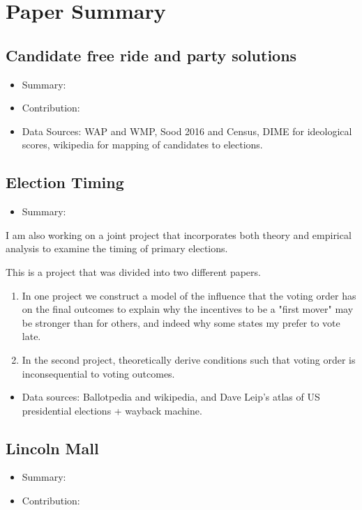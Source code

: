 \documentclass[12pt]{article}
\theoremstyle{plain}
\theoremstyle{plain}
\theoremstyle{plain}
\theoremstyle{plain}
\theoremstyle{plain}
\theoremstyle{plain}
\begin{document}
\section{Paper Summary}
\label{sec:org1e52e05}
\subsection{Candidate free ride and party solutions}
\label{sec:org4358c61}
\begin{itemize}
\item Summary:
\item Contribution:
\item Data Sources: WAP and WMP, Sood 2016 and Census, DIME for ideological scores, wikipedia for mapping of candidates to elections.
\end{itemize}
\subsection{Election Timing}
\label{sec:org3737faa}

\begin{itemize}
\item Summary:
\end{itemize}

I am also working on a joint project that incorporates both theory and empirical analysis to examine the timing of primary elections.

This is a project that was divided into two different papers.

\begin{enumerate}
\item In one project we construct a model of the influence that the voting order has on the final outcomes to explain why the incentives to be a "first mover" may be stronger than for others, and indeed why some states my prefer to vote late.

\item In the second project, theoretically derive conditions such that voting order is inconsequential to voting outcomes.
\end{enumerate}


\begin{itemize}
\item Data sources: Ballotpedia and wikipedia, and Dave Leip's atlas of US presidential elections + wayback machine.
\end{itemize}

\subsection{Lincoln Mall}
\label{sec:org11feb05}
\begin{itemize}
\item Summary:
\item Contribution:
\end{itemize}
\end{document}
